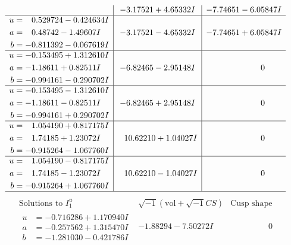 \documentclass[1p]{elsarticle_modified}
\theoremstyle{definition}
\newcommand{\I}{\sqrt{-1}}
\begin{document}
$$\begin{array}{c|c|c}
 & -3.17521 + 4.65332 I & -7.74651 - 6.05847 I \\ \hline\begin{aligned}
u &= \phantom{-}0.529724 - 0.424634 I \\
a &= \phantom{-}0.48742 - 1.49607 I \\
b &= -0.811392 - 0.067619 I\end{aligned}
 & -3.17521 - 4.65332 I & -7.74651 + 6.05847 I \\ \hline\begin{aligned}
u &= -0.153495 + 1.312610 I \\
a &= -1.18611 + 0.82511 I \\
b &= -0.994161 - 0.290702 I\end{aligned}
 & -6.82465 - 2.95148 I & \phantom{-0.000000 } 0 \\ \hline\begin{aligned}
u &= -0.153495 - 1.312610 I \\
a &= -1.18611 - 0.82511 I \\
b &= -0.994161 + 0.290702 I\end{aligned}
 & -6.82465 + 2.95148 I & \phantom{-0.000000 } 0 \\ \hline\begin{aligned}
u &= \phantom{-}1.054190 + 0.817175 I \\
a &= \phantom{-}1.74185 + 1.23072 I \\
b &= -0.915264 - 1.067760 I\end{aligned}
 & \phantom{-}10.62210 + 1.04027 I & \phantom{-0.000000 } 0 \\ \hline\begin{aligned}
u &= \phantom{-}1.054190 - 0.817175 I \\
a &= \phantom{-}1.74185 - 1.23072 I \\
b &= -0.915264 + 1.067760 I\end{aligned}
 & \phantom{-}10.62210 - 1.04027 I & \phantom{-0.000000 } 0\\
 \hline 
 \end{array}$$\newpage$$\begin{array}{c|c|c}  
\text{Solutions to }I^u_{1}& \I (\text{vol} + \sqrt{-1}CS) & \text{Cusp shape}\\
 \hline 
\begin{aligned}
u &= -0.716286 + 1.170940 I \\
a &= -0.257562 + 1.315470 I \\
b &= -1.281030 - 0.421786 I\end{aligned}
 & -1.88294 - 7.50272 I & \phantom{-0.000000 } 0 \\ \hline\begin{aligned}

\end{aligned}
\end{array}$$
\end{document}
